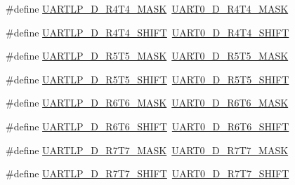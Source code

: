 \begin{DoxyCompactItemize}
\item 
\#define \hyperlink{group___backward___compatibility___symbols_ga4c58c78e1a9349104a0d2e4fb70fd84c}{U\+A\+R\+T\+L\+P\+\_\+\+D\+\_\+\+R4\+T4\+\_\+\+M\+A\+SK}~\hyperlink{group___u_a_r_t0___register___masks_ga9ef0e5c43310e85c56accdcac2193bd7}{U\+A\+R\+T0\+\_\+\+D\+\_\+\+R4\+T4\+\_\+\+M\+A\+SK}
\item 
\#define \hyperlink{group___backward___compatibility___symbols_gab6c3b555bd24f99faf903fca53e04b11}{U\+A\+R\+T\+L\+P\+\_\+\+D\+\_\+\+R4\+T4\+\_\+\+S\+H\+I\+FT}~\hyperlink{group___u_a_r_t0___register___masks_gae0e84ea8d517404064d82a8fac69e39a}{U\+A\+R\+T0\+\_\+\+D\+\_\+\+R4\+T4\+\_\+\+S\+H\+I\+FT}
\item 
\#define \hyperlink{group___backward___compatibility___symbols_gac7792e726a24f4d48b8c401c854dbfbe}{U\+A\+R\+T\+L\+P\+\_\+\+D\+\_\+\+R5\+T5\+\_\+\+M\+A\+SK}~\hyperlink{group___u_a_r_t0___register___masks_gaaeccc9a4eea797b215e73defa6eb7fbb}{U\+A\+R\+T0\+\_\+\+D\+\_\+\+R5\+T5\+\_\+\+M\+A\+SK}
\item 
\#define \hyperlink{group___backward___compatibility___symbols_ga7dc8ab69f890eae57d8f33dd89bcae94}{U\+A\+R\+T\+L\+P\+\_\+\+D\+\_\+\+R5\+T5\+\_\+\+S\+H\+I\+FT}~\hyperlink{group___u_a_r_t0___register___masks_gad5485d0f250bb194d8c7722f76666178}{U\+A\+R\+T0\+\_\+\+D\+\_\+\+R5\+T5\+\_\+\+S\+H\+I\+FT}
\item 
\#define \hyperlink{group___backward___compatibility___symbols_gaf6bdbb0511877a1daf3a0f24949f04d7}{U\+A\+R\+T\+L\+P\+\_\+\+D\+\_\+\+R6\+T6\+\_\+\+M\+A\+SK}~\hyperlink{group___u_a_r_t0___register___masks_gad555e177bcea7c90924e5a98be00380c}{U\+A\+R\+T0\+\_\+\+D\+\_\+\+R6\+T6\+\_\+\+M\+A\+SK}
\item 
\#define \hyperlink{group___backward___compatibility___symbols_gaf522e3a2789a7bf0912c309036f2f3b7}{U\+A\+R\+T\+L\+P\+\_\+\+D\+\_\+\+R6\+T6\+\_\+\+S\+H\+I\+FT}~\hyperlink{group___u_a_r_t0___register___masks_ga1083033a9d6894a5c264dac4f7dc67ce}{U\+A\+R\+T0\+\_\+\+D\+\_\+\+R6\+T6\+\_\+\+S\+H\+I\+FT}
\item 
\#define \hyperlink{group___backward___compatibility___symbols_gac4d9354f0bdb6c5e9eac60835c37bb0a}{U\+A\+R\+T\+L\+P\+\_\+\+D\+\_\+\+R7\+T7\+\_\+\+M\+A\+SK}~\hyperlink{group___u_a_r_t0___register___masks_gab3a6b86f1cf57c7559bd4200509a354b}{U\+A\+R\+T0\+\_\+\+D\+\_\+\+R7\+T7\+\_\+\+M\+A\+SK}
\item 
\#define \hyperlink{group___backward___compatibility___symbols_gab2a3957242355f16f9523cdba45c32b6}{U\+A\+R\+T\+L\+P\+\_\+\+D\+\_\+\+R7\+T7\+\_\+\+S\+H\+I\+FT}~\hyperlink{group___u_a_r_t0___register___masks_gabe35832ee13e5e5b6ab53ad6f357bac2}{U\+A\+R\+T0\+\_\+\+D\+\_\+\+R7\+T7\+\_\+\+S\+H\+I\+FT}

\end{DoxyCompactItemize}

